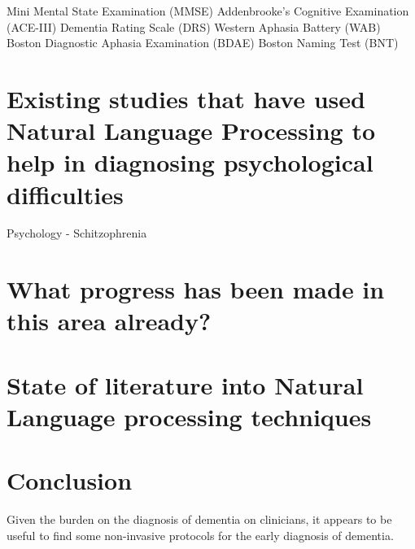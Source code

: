 \documentclass[a4paper]{article}
\begin{document}
Mini Mental State Examination (MMSE)
Addenbrooke's Cognitive Examination (ACE-III)
Dementia Rating Scale (DRS)
Western Aphasia Battery (WAB)
Boston Diagnostic Aphasia Examination (BDAE)
Boston Naming Test (BNT)

\section{Existing studies that have used Natural Language Processing to help in diagnosing psychological difficulties}

Psychology - Schitzophrenia

\section{What progress has been made in this area already?}

\section{State of literature into Natural Language processing techniques}

\section{Conclusion}
Given the burden on the diagnosis of dementia on clinicians, it appears to be useful to find some non-invasive protocols for the early diagnosis of dementia. 
\end{document}
